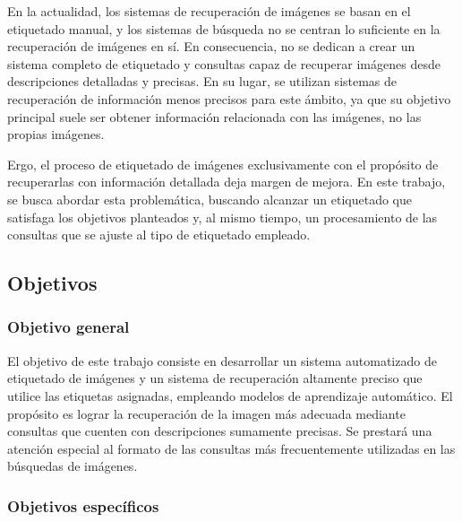 En la actualidad, los sistemas de recuperaci\'on de im\'agenes se basan en el etiquetado manual, y los sistemas de b\'usqueda no se centran lo suficiente en la recuperaci\'on de im\'agenes en s\'i. En consecuencia, no se dedican a crear un sistema completo de etiquetado y consultas capaz de recuperar im\'agenes desde descripciones detalladas y precisas. En su lugar, se utilizan sistemas de recuperaci\'on de informaci\'on menos precisos para este \'ambito, ya que su objetivo principal suele ser obtener informaci\'on relacionada con las im\'agenes, no las propias im\'agenes.

Ergo, el proceso de etiquetado de im\'agenes exclusivamente con el prop\'osito de recuperarlas con informaci\'on detallada deja margen de mejora. En este trabajo, se busca abordar esta problem\'atica, buscando alcanzar un etiquetado que satisfaga los objetivos planteados y, al mismo tiempo, un procesamiento de las consultas que se ajuste al tipo de etiquetado empleado.
\subsection*{Objetivos}

\subsubsection* {Objetivo general}

El objetivo de este trabajo consiste en desarrollar un sistema automatizado de etiquetado de im\'agenes y un sistema de recuperaci\'on altamente preciso que utilice las etiquetas asignadas, empleando modelos de aprendizaje autom\'atico. El prop\'osito es lograr la recuperaci\'on de la imagen m\'as adecuada mediante consultas que cuenten con descripciones sumamente precisas. Se prestar\'a una atenci\'on especial al formato de las consultas m\'as frecuentemente utilizadas en las b\'usquedas de im\'agenes.

\subsubsection*{Objetivos espec\'ificos}

